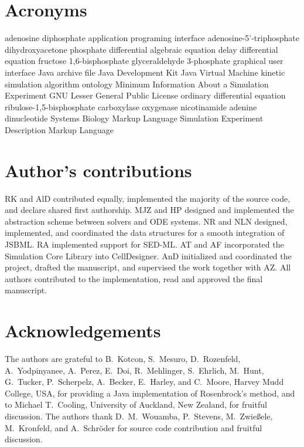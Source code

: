 \documentclass[10pt]{bmc_article}
\newenvironment{bmcformat}{\fussy\setboolean{publ}{true}}{\fussy}
\begin{document}
\begin{bmcformat}
\section*{Acronyms}
\begin{acronym}
         {adenosine diphosphate}
         {application programing interface}
         {adenosine-5'-triphosphate}
        {dihydroxyacetone phosphate}
         {differential algebraic equation}
         {delay differential equation}
      {fructose 1,6-bisphosphate}
        {glyceraldehyde 3-phosphate}
         {graphical user interface}
         {Java archive file}
         {Java Development Kit}
         {Java Virtual Machine}
       {kinetic simulation algorithm ontology}
       {Minimum Information About a Simulation Experiment}
        {GNU Lesser General Public License}
         {ordinary differential equation}
     {ribulose-1,5-bisphosphate carboxylase oxygenase}
     {nicotinamide adenine dinucleotide}
        {Systems Biology Markup Language}
      {Simulation Experiment Description Markup Language}
\end{acronym}


\section*{Author's contributions}
RK and AlD contributed equally, implemented the majority of the source code, and declare shared first authorship.
MJZ and HP designed and implemented the abstraction scheme between solvers and \acs{ODE} systems.
NR and NLN designed, implemented, and coordinated the data structures for a smooth integration of JSBML.
RA implemented support for \acs{SED-ML}. AT and AF incorporated the Simulation Core Library into CellDesigner.
AnD initialized and coordinated the project, drafted the manuscript, and supervised the work together with AZ.
All authors contributed to the implementation, read and approved the final manuscript.    

\section*{Acknowledgements}
The authors are grateful to B.~Kotcon, S.~Mesuro, D.~Rozenfeld, A.~Yodpinyanee,
A.~Perez, E.~Doi, R.~Mehlinger, S.~Ehrlich, M.~Hunt, G.~Tucker, P.~Scherpelz,
A.~Becker, E.~Harley, and C.~Moore, Harvey Mudd College, USA, for providing a
Java implementation of Rosenbrock's method, and to Michael T.~Cooling,
University of Auckland, New Zealand, for fruitful discussion. The authors thank
D.~M.~Wouamba, P.~Stevens, M.~Zwie\ss{}ele, M.~Kronfeld, and A.~Schr\"oder for
source code contribution and fruitful discussion.


\end{bmcformat}
\end{document}
